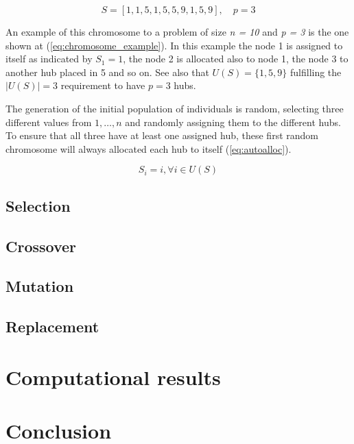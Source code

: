 \documentclass[onecolumn]{IEEEtran}
\begin{document}
\begin{equation}
  S = [1, 1, 5, 1, 5, 5, 9, 1, 5, 9 ],\quad p = 3 \label{eq:chromosome_example}
\end{equation}

An example of this chromosome to a problem of size \emph{n = 10} and \emph{p = 3} is the one shown
at (\ref{eq:chromosome_example}). In this example the node 1 is assigned to itself as indicated
by $S_{1}=1$, the node 2 is allocated also to node 1, the node 3 to another hub placed in 5 and so on.
See also that $U(S)=\{1,5,9\}$ fulfilling the $|U(S)|=3$ requirement to have $p=3$ hubs.

The generation of the initial population of individuals is random, selecting three different values from
${1,\dots,n}$ and randomly assigning them to the different hubs. To ensure that all three have at least
one assigned hub, these first random chromosome will always allocated each hub to itself (\ref{eq:autoalloc}).

\begin{equation}
  S_{i}=i, \forall i \in U(S) \label{eq:autoalloc}
\end{equation}

\subsection{Selection}

\subsection{Crossover\label{ss:crossover}}

\subsection{Mutation\label{ss:mutation}}

\subsection{Replacement}

\section{Computational results}

\section{Conclusion}



\end{document}
